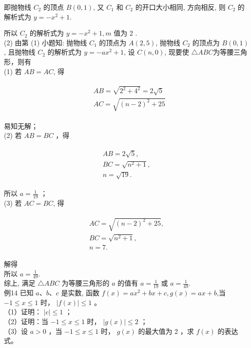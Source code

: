 \documentclass[10pt]{article}
\begin{document}
即抛物线 $C_{2}$ 的顶点 $B(0,1)$, 又 $C_{1}$ 和 $C_{2}$ 的开口大小相同, 方向相反, 则 $C_{2}$ 的解析式为 $y=-x^{2}+1$.

所以 $C_{2}$ 的解析式为 $y=-x^{2}+1, m$ 值为 2 .\\
(2) 由第 (1) 小题知: 抛物线 $C_{1}$ 的顶点为 $A(2,5)$, 抛物线 $C_{2}$ 的顶点为 $B(0,1)$, 且抛物线 $C_{2}$ 的解析式为 $y=-a x^{2}+1$, 设 $C(n, 0)$, 现要使 $\triangle A B C$为等腰三角形，则有\\
(1) 若 $A B=A C$, 得

\begin{align*}
\begin{aligned}
& A B=\sqrt{2^{2}+4^{2}}=2 \sqrt{5} \\
& A C=\sqrt{(n-2)^{2}+25}
\end{aligned}
\end{align*}

易知无解；\\
(2) 若 $A B=B C$ ，得

\begin{align*}
\begin{gathered}
A B=2 \sqrt{5}, \\
B C=\sqrt{n^{2}+1}, \\
n=\sqrt{19} .
\end{gathered}
\end{align*}

所以 $a=\frac{1}{19}$ ；\\
(3) 若 $A C=B C$, 得

\begin{align*}
\begin{gathered}
A C=\sqrt{(n-2)^{2}+25}, \\
B C=\sqrt{n^{2}+1}, \\
n=7 .
\end{gathered}
\end{align*}

解得\\
所以 $a=\frac{1}{49}$.\\
综上, 满足 $\triangle A B C$ 为等腰三角形的 $a$ 的值有 $a=\frac{1}{19}$ 或 $a=\frac{1}{49}$.\\
例14 已知 $a 、 b 、 c$ 是实数, 函数 $f(x)=a x^{2}+b x+c, g(x)=a x+b$,当 $-1 \leqslant x \leqslant 1$ 时， $|f(x)| \leqslant 1$ 。\\
（1）证明： $|c| \leqslant 1$ ；\\
（2）证明：当 $-1 \leqslant x \leqslant 1$ 时， $|g(x)| \leqslant 2$ ；\\
（3）设 $a>0$ ，当 $-1 \leqslant x \leqslant 1$ 时， $g(x)$ 的最大值为 2 ，求 $f(x)$ 的表达式。
\end{document}
